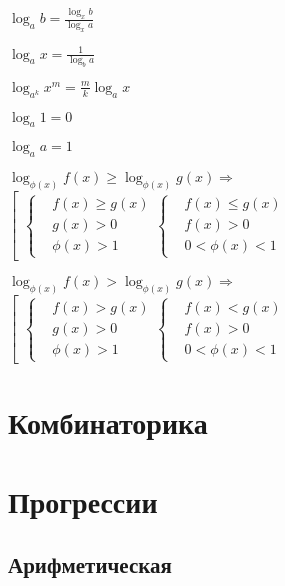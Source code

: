 $ \log_a b = \frac{\log_x b}{\log_x a} $

$ \log_a x = \frac{1}{\log_b a} $

$ \log_{a^k} x^m = \frac{m}{k} \log_a x $

$ \log_a 1 = 0 $

$ \log_a a = 1 $

$ \log_{\phi(x)} f(x) \ge \log_{\phi(x)} g(x) \Rightarrow $ $ \left[
	\begin{aligned}
		\left\{ \begin{aligned}
			& f(x) \ge g(x) \\
			& g(x) > 0 \\
			& \phi(x) > 1
		\end{aligned} \right.
		\left\{ \begin{aligned}
			& f(x) \le g(x) \\
			& f(x) > 0 \\
			& 0 < \phi(x) < 1
		\end{aligned} \right.
	\end{aligned} \right. $

$ \log_{\phi(x)} f(x) > \log_{\phi(x)} g(x) \Rightarrow $ $ \left[
	\begin{aligned}
		\left\{ \begin{aligned}
			& f(x) > g(x) \\
			& g(x) > 0 \\
			& \phi(x) > 1
		\end{aligned} \right.
		\left\{ \begin{aligned}
			& f(x) < g(x) \\
			& f(x) > 0 \\
			& 0 < \phi(x) < 1
		\end{aligned} \right.
	\end{aligned} \right. $

	
\section{Комбинаторика}

	
\section{Прогрессии}

\subsection{Арифметическая}


